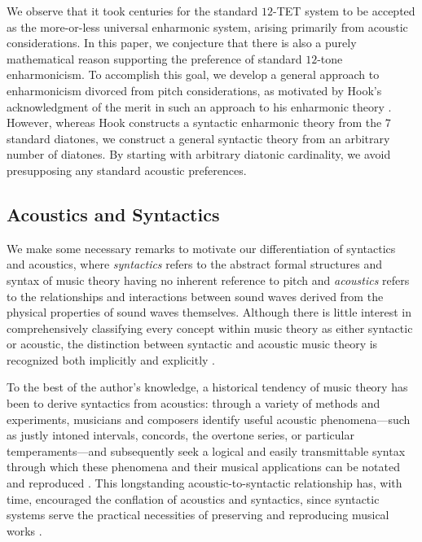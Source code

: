 \documentclass{article}
\theoremstyle{plain}
\theoremstyle{definition}
\theoremstyle{remark}
\begin{document}
We observe that it took centuries for the standard $12$-TET system to be accepted as the more-or-less universal enharmonic system, arising primarily from acoustic considerations. In this paper, we conjecture that there is also a purely mathematical reason supporting the preference of standard $12$-tone enharmonicism. To accomplish this goal, we develop a general approach to enharmonicism divorced from pitch considerations, as motivated by Hook's acknowledgment of the merit in such an approach to his enharmonic theory \cite{Hook}. However, whereas Hook constructs a syntactic enharmonic theory from the $7$ standard diatones, we construct a general syntactic theory from an arbitrary number of diatones. By starting with arbitrary diatonic cardinality, we avoid presupposing any standard acoustic preferences.

\subsection{Acoustics and Syntactics}
\label{SSEC.Acoustics and Syntactics}

We make some necessary remarks to motivate our differentiation of syntactics and acoustics, where \textit{syntactics} refers to the abstract formal structures and syntax of music theory having no inherent reference to pitch and \textit{acoustics} refers to the relationships and interactions between sound waves derived from the physical properties of sound waves themselves. Although there is little interest in comprehensively classifying every concept within music theory as either syntactic or acoustic, the distinction between syntactic and acoustic music theory is recognized both implicitly \cite{Clough_Douthett} and explicitly \cite{Hook}.

To the best of the author's knowledge, a historical tendency of music theory has been to derive syntactics from acoustics: through a variety of methods and experiments, musicians and composers identify useful acoustic phenomena---such as justly intoned intervals, concords, the overtone series, or particular temperaments---and subsequently seek a logical and easily transmittable syntax through which these phenomena and their musical applications can be notated and reproduced \cite{Tinctoris,Zarlino,Rameau}. This longstanding acoustic-to-syntactic relationship has, with time, encouraged the conflation of acoustics and syntactics, since syntactic systems serve the practical necessities of preserving and reproducing musical works \cite{Guido}.
\end{document}
